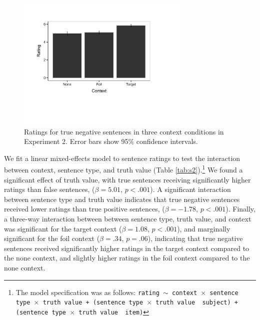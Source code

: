 \documentclass[10pt,letterpaper]{article}
\begin{document}
\begin{figure}
\begin{center} 
\includegraphics[width=3.25in]{figures/study2.pdf}
\caption{\label{fig:s2} Ratings for true negative sentences in three context conditions in Experiment 2.  Error bars show 95\% confidence intervals.}
\end{center} 
\end{figure}

We fit a linear mixed-effects model to sentence ratings to test the interaction between context, sentence type, and truth value (Table \ref{tab:s2}).\footnote{ The model specification was as follows: \texttt{rating $\sim$ context~$\times$~sentence type~$\times$~truth value + (sentence type~$\times$~truth value~\textbar~subject) +  (sentence type~$\times$~truth value~\textbar~item)}}  We found a significant effect of truth value, with true sentences receiving significantly higher ratings than false sentences, ($\beta= 5.01$, $p< .001$).  A significant interaction between sentence type and truth value indicates that true negative sentences received lower ratings than true positive sentences, ($\beta= -1.78$, $p< .001$).  Finally, a three-way interaction between between sentence type, truth value, and context was significant for the target context ($\beta= 1.08$, $p< .001$), and marginally significant for the foil context ($\beta= .34$, $p=.06$), indicating that true negative sentences received significantly higher ratings in the target context compared to the none context, and slightly higher ratings in the foil context compared to the none context.  
\end{document}
